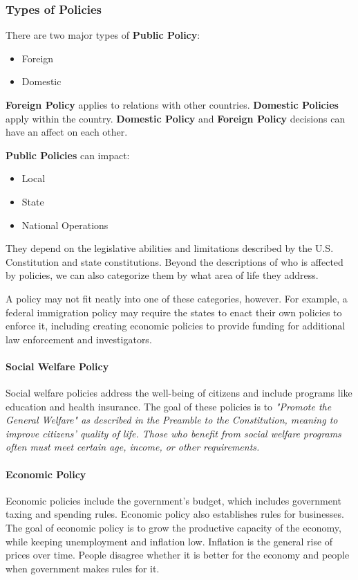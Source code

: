 
\subsubsection*{Types of Policies}

There are two major types of \textbf{Public Policy}:

\begin{itemize}
    \item Foreign
    \item Domestic
\end{itemize}

\textbf{Foreign Policy} applies to relations with other countries. \textbf{Domestic Policies} apply within the country. \textbf{Domestic Policy} and \textbf{Foreign Policy} decisions can have an affect on each other.

\textbf{Public Policies} can impact:

\begin{itemize}
    \item Local
    \item State
    \item National Operations
\end{itemize}

They depend on the legislative abilities and limitations described by the U.S. Constitution and state constitutions. Beyond the descriptions of who is affected by policies, we can also categorize them by what area of life they address.

A policy may not fit neatly into one of these categories, however. For example, a federal immigration policy may require the states to enact their own policies to enforce it, including creating economic policies to provide funding for additional law enforcement and investigators.

\paragraph{Social Welfare Policy} Social welfare policies address the well-being of citizens and include programs like education and health insurance. The goal of these policies is to \it{"Promote the General Welfare"} as described in the Preamble to the Constitution, meaning to improve citizens' quality of life. Those who benefit from social welfare programs often must meet certain age, income, or other requirements.

\paragraph{Economic Policy} Economic policies include the government's budget, which includes government taxing and spending rules. Economic policy also establishes rules for businesses. The goal of economic policy is to grow the productive capacity of the economy, while keeping unemployment and inflation low. Inflation is the general rise of prices over time. People disagree whether it is better for the economy and people when government makes rules for it.

